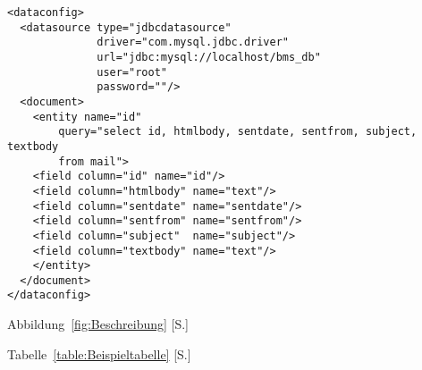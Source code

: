 \lstset{language=xml}
\begin{lstlisting}[float=!ht, frame=htrbl, caption={die datei {\normalfont \ttfamily  data-config.xml} dient als beispiel für xml quellcode}, label={lst:dataconfigxml}]
<dataconfig>
  <datasource type="jdbcdatasource" 
              driver="com.mysql.jdbc.driver"
              url="jdbc:mysql://localhost/bms_db"
              user="root" 
              password=""/>
  <document>
    <entity name="id"
        query="select id, htmlbody, sentdate, sentfrom, subject, textbody
        from mail">
    <field column="id" name="id"/>
    <field column="htmlbody" name="text"/>
    <field column="sentdate" name="sentdate"/>
    <field column="sentfrom" name="sentfrom"/>
    <field column="subject"  name="subject"/>
    <field column="textbody" name="text"/>
    </entity>
  </document>
</dataconfig>
\end{lstlisting}

Abbildung~\ref{fig:Beschreibung} [S.\pageref{fig:Beschreibung}]

Tabelle~\ref{table:Beispieltabelle} [S.\pageref{table:Beispieltabelle}]

~\cite[S.55]{mf2005}

